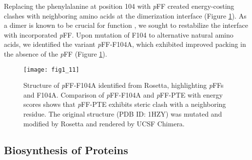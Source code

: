 \begin{refsection}
Replacing the phenylalanine at position 104 with \emph{p}FF created
energy-costing clashes with neighboring amino acids at the dimerization
interface (Figure \ref{fig:rosetta-pte}). As a dimer is known to be crucial for
function \cite{Baker2011b}, we sought to restabilize the interface with
incorporated \emph{p}FF. Upon mutation of F104 to alternative natural amino
acids, we identified the variant \emph{p}FF-F104A, which exhibited improved
packing in the absence of the \emph{p}FF (Figure \ref{fig:rosetta-pte}).
\begin{figure}[h!] \centering \texttt{[image: fig1\_11]}
    \caption[Structure of \emph{p}FF-F104A identified from Rosetta,
        highlighting \emph{p}FFs and F104A. Comparison of \emph{p}FF-F104A and
        \emph{p}FF-PTE with energy scores shows that \emph{p}FF-PTE exhibits
        steric clash with a neighboring residue.  The original structure (PDB
        ID: 1HZY) was mutated and modified by Rosetta and rendered by UCSF
    Chimera.]{Structure of \emph{p}FF-F104A identified from Rosetta,
    highlighting \emph{p}FFs and F104A. Comparison of \emph{p}FF-F104A and
    \emph{p}FF-PTE with energy scores shows that \emph{p}FF-PTE exhibits steric
    clash with a neighboring residue. The original structure (PDB ID: 1HZY) was
    mutated and modified by Rosetta and rendered by UCSF Chimera.}
    \label{fig:rosetta-pte}
\end{figure}

\subsection{Biosynthesis of Proteins}


\end{refsection}
